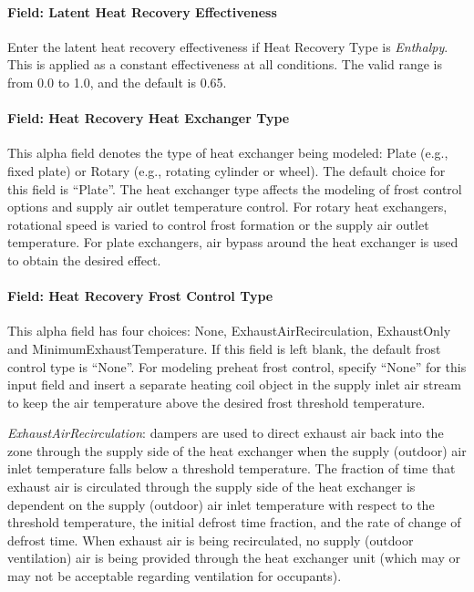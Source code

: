 \paragraph{Field: Latent Heat Recovery Effectiveness}\label{field-latent-heat-recovery-effectiveness-3}

Enter the latent heat recovery effectiveness if Heat Recovery Type is \emph{Enthalpy}. This is applied as a constant effectiveness at all conditions. The valid range is from 0.0 to 1.0, and the default is 0.65.

\paragraph{Field: Heat Recovery Heat Exchanger Type}\label{field-heat-recovery-heat-exchanger-type}

This alpha field denotes the type of heat exchanger being modeled: Plate (e.g., fixed plate) or Rotary (e.g., rotating cylinder or wheel). The default choice for this field is ``Plate''. The heat exchanger type affects the modeling of frost control options and supply air outlet temperature control. For rotary heat exchangers, rotational speed is varied to control frost formation or the supply air outlet temperature. For plate exchangers, air bypass around the heat exchanger is used to obtain the desired effect.

\paragraph{Field: Heat Recovery Frost Control Type}\label{field-heat-recovery-frost-control-type}

This alpha field has four choices: None, ExhaustAirRecirculation, ExhaustOnly and MinimumExhaustTemperature. If this field is left blank, the default frost control type is ``None''. For modeling preheat frost control, specify ``None'' for this input field and insert a separate heating coil object in the supply inlet air stream to keep the air temperature above the desired frost threshold temperature.

\emph{ExhaustAirRecirculation}: dampers are used to direct exhaust air back into the zone through the supply side of the heat exchanger when the supply (outdoor) air inlet temperature falls below a threshold temperature. The fraction of time that exhaust air is circulated through the supply side of the heat exchanger is dependent on the supply (outdoor) air inlet temperature with respect to the threshold temperature, the initial defrost time fraction, and the rate of change of defrost time. When exhaust air is being recirculated, no supply (outdoor ventilation) air is being provided through the heat exchanger unit (which may or may not be acceptable regarding ventilation for occupants).

